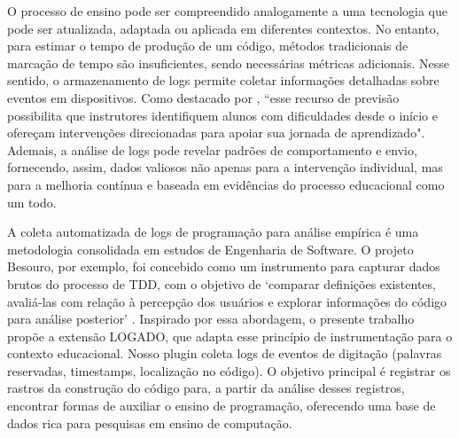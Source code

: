 O processo de ensino pode ser compreendido analogamente a uma 
tecnologia que pode ser atualizada, adaptada ou aplicada em 
diferentes contextos. No entanto, para estimar o tempo de 
produção de um código, métodos tradicionais de marcação 
de tempo são insuficientes, sendo necessárias métricas 
adicionais. Nesse sentido, o armazenamento de logs permite 
coletar informações detalhadas sobre eventos em dispositivos. 
Como destacado por \cite{nguyen_analyzing_2023}, 
``esse recurso de previsão possibilita que instrutores 
identifiquem alunos com dificuldades desde o início e ofereçam 
intervenções direcionadas para apoiar sua jornada de 
aprendizado". Ademais, a análise de logs pode revelar padrões 
de comportamento e envio, fornecendo, assim,  dados valiosos não 
apenas para a intervenção individual, mas para a melhoria 
contínua  e baseada em evidências do processo educacional como um 
todo.

A coleta automatizada de logs de programação para análise 
empírica é uma metodologia consolidada em estudos de Engenharia 
de Software. O projeto Besouro, por exemplo, foi concebido como 
um instrumento para capturar dados brutos do processo de TDD, com 
o objetivo de `comparar definições existentes, avaliá-las com 
relação à percepção dos usuários e explorar informações do 
código para análise posterior' \cite{becker2015besouro}. 
Inspirado por essa abordagem, o presente trabalho propõe a 
extensão LOGADO, que adapta esse princípio de instrumentação para 
o contexto educacional. Nosso plugin coleta logs de eventos de 
digitação (palavras reservadas, timestamps, localização no 
código). O objetivo principal é registrar os rastros da 
construção do código para, a partir da análise desses registros, 
encontrar formas de auxiliar o ensino de programação, oferecendo 
uma base de dados rica para pesquisas em ensino de computação.

